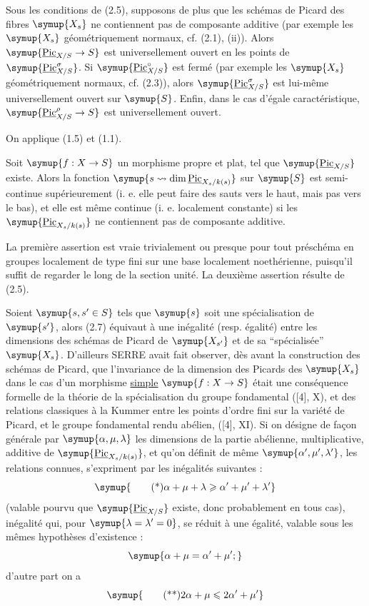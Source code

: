  Sous les conditions de (2.5), supposons de plus que les
schémas de Picard des fibres $\symup{X_s}$ ne contiennent pas de composante additive
(par exemple les $\symup{X_s}$ géométriquement normaux, cf. (2.1), (ii)). Alors
$\symup{\underline{\operatorname{Pic}}_{X/S}\to S}$ est universellement ouvert en les
points de $\symup{\underline{\operatorname{Pic}}_{X/S}^\sigma}$. Si
$\symup{\underline{\operatorname{Pic}}_{X/S}^\circ}$ est fermé (par exemple les $\symup{X_s}$
géométriquement normaux, cf. (2.3)), alors
$\symup{\underline{\operatorname{Pic}}_{X/S}^\sigma}$ est lui-même universellement ouvert sur $\symup{S}$.
Enfin, dans le cas d'égale caractéristique,
$\symup{\underline{\operatorname{Pic}}_{X/S}^\rho\to S}$ est universellement ouvert.

On applique (1.5) et (1.1).

 Soit $\symup{f:X\to S}$ un morphisme propre et
plat, tel que $\symup{\underline{\operatorname{Pic}}_{X/S}}$ existe. Alors la fonction $\symup{s\rightsquigarrow\dim\underline{\operatorname{Pic}}_{X_s/k(s)}}$ sur $\symup{S}$ est semi-continue supérieurement (i. e. elle peut faire des sauts vers
le haut, mais pas vers le bas), et elle est même continue (i. e. localement
constante) si les $\symup{\underline{\operatorname{Pic}}_{X_s/k(s)}}$ ne contiennent pas de
composante additive.

La première assertion est vraie trivialement ou presque pour tout préschéma en
groupes localement de type fini sur une base localement noethérienne, puisqu'il
suffit de regarder le long de la section unité. La deuxième assertion résulte
de (2.5).

 Soient $\symup{s,s'\in S}$ tels que $\symup{s}$ soit une spécialisation
de $\symup{s'}$, alors (2.7) équivaut à une inégalité (resp. égalité) entre les
dimensions des schémas de Picard de $\symup{X_{s'}}$ et de sa ``spécialisée'' $\symup{X_s}$.
D'ailleurs SERRE avait fait observer, dès avant la construction des schémas de
Picard, que l'invariance de la dimension des Picards des $\symup{X_s}$ dans le cas d'un
morphisme \uline{simple} $\symup{f:X\to S}$ était une conséquence formelle de la
théorie de la spécialisation du groupe fondamental ([4], X), et des relations
classiques à la Kummer entre les points d'ordre fini sur la variété de Picard,
et le groupe fondamental rendu abélien, ([4], XI). Si on désigne de façon
générale par $\symup{\alpha,\mu,\lambda}$ les dimensions de la partie abélienne,
multiplicative, additive de $\symup{\underline{\operatorname{Pic}}_{X_s/k(s)}}$, et qu'on
définit de même $\symup{\alpha',\mu',\lambda'}$, les relations connues, s'expriment par
les inégalités suivantes :
\[
\symup{\tag{*}\alpha+\mu+\lambda\geqslant\alpha'+\mu'+\lambda'}
\]
(valable pourvu que $\symup{\underline{\operatorname{Pic}}_{X/S}}$ existe, donc probablement en
tous cas), inégalité qui, pour $\symup{\lambda=\lambda'=0}$, se réduit à une égalité,
valable sous les mêmes hypothèses d'existence :
\[
\symup{\alpha+\mu=\alpha'+\mu' ;}
\]
d'autre part on a
\[
\symup{\tag{**}2\alpha+\mu\leqslant2\alpha'+\mu'}
\]

